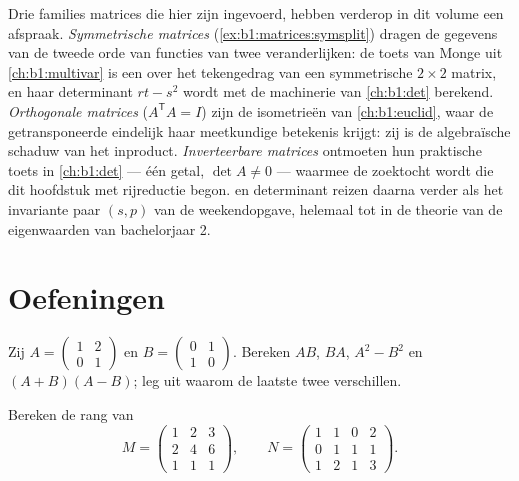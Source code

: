 \begin{remark}
\label{rem:b1:matrices:perspectives}
Drie families matrices die hier zijn ingevoerd, hebben verderop in
dit volume een afspraak. \emph{Symmetrische matrices}
(\cref{ex:b1:matrices:symsplit}) dragen de gegevens van de tweede
orde van functies van twee veranderlijken: de toets van Monge uit
\cref{ch:b1:multivar} is een  over het tekengedrag van
een symmetrische $2\times2$ matrix, en haar determinant $rt - s^2$
wordt met de machinerie van \cref{ch:b1:det} berekend.
\emph{Orthogonale matrices} ($A^{\mathsf T}A = I$) zijn de
isometrieën van \cref{ch:b1:euclid}, waar de getransponeerde
eindelijk haar meetkundige betekenis krijgt: zij is de
algebraïsche schaduw van het inproduct. \emph{Inverteerbare
matrices} ontmoeten hun praktische toets in \cref{ch:b1:det} ---
één getal, $\det A \neq 0$ --- waarmee de zoektocht wordt 
die dit hoofdstuk met rijreductie begon.  en determinant
reizen daarna verder als het invariante paar $(s, p)$ van de
weekendopgave, helemaal tot in de theorie van de eigenwaarden van
bachelorjaar 2.
\end{remark}

\section{Oefeningen}

\begin{exercise}[$\star$]\label{exo:b1:matrices:1}
Zij $A = \begin{pmatrix} 1 & 2 \\ 0 & 1 \end{pmatrix}$ en $B =
\begin{pmatrix} 0 & 1 \\ 1 & 0\end{pmatrix}$. Bereken $AB$, $BA$,
$A^2 - B^2$ en $(A+B)(A-B)$; leg uit waarom de laatste twee
verschillen.
\end{exercise}

\begin{exercise}[$\star$]\label{exo:b1:matrices:2}
Bereken de rang van
\[
M = \begin{pmatrix}
1 & 2 & 3\\
2 & 4 & 6\\
1 & 1 & 1
\end{pmatrix},
\qquad
N = \begin{pmatrix}
1 & 1 & 0 & 2\\
0 & 1 & 1 & 1\\
1 & 2 & 1 & 3
\end{pmatrix}.
\]
\end{exercise}


